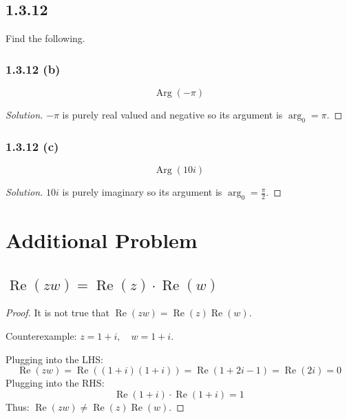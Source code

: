 \documentclass{article}
\newenvironment{solution}{
\begin{proof}[Solution]}{
\end{proof}}
\begin{document}
\subsection*{1.3.12}
Find the following.

\subsubsection*{1.3.12 (b)}
\[
  \operatorname{Arg}(-\pi)
\]
\begin{solution}
  $-\pi$ is purely real valued and negative so its argument is $\arg_0 = \pi$.
\end{solution}

\subsubsection*{1.3.12 (c)}
\[
  \operatorname{Arg}(10i)
\]
\begin{solution}
  $10i$ is purely imaginary so its argument is $\arg_0 = \frac{\pi}{2}$.
\end{solution}

\section*{Additional Problem}

\subsection*{$\operatorname{Re}(zw) = \operatorname{Re}(z) \cdot \operatorname{Re}(w)$}
\begin{proof}
  It is not true that $\operatorname{Re}(zw) = \operatorname{Re}(z)\operatorname{Re}(w)$.

  Counterexample: $z = 1 + i, \quad w = 1 + i$.

  Plugging into the LHS:
  \[
    \operatorname{Re}(zw) = \operatorname{Re}((1+i)(1+i)) = \operatorname{Re}(1 + 2i - 1) = \operatorname{Re}(2i) = 0
  \]
  Plugging into the RHS:
  \[
    \operatorname{Re}(1+i) \cdot \operatorname{Re}(1+i) = 1
  \]
  Thus: $\operatorname{Re}(zw) \neq \operatorname{Re}(z)\operatorname{Re}(w)$.
\end{proof}
\end{document}

